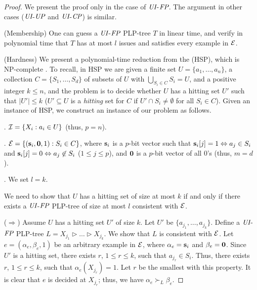 \begin{proof}
	We present the proof only in the case of $\textit{UI}$-$\textit{FP}$. The argument in other cases 
	($\textit{UI}$-$\textit{UP}$ and $\textit{UI}$-$\textit{CP}$) is similar.

	(Membership) One can guess a $\textit{UI}$-$\textit{FP}$ PLP-tree $T$ in linear time, and verify in polynomial time that 
	$T$ has at most $l$ issues and satisfies every example in $\mathcal{E}$.

	(Hardness) We present a polynomial-time reduction from the
	 (HSP), which is NP-complete 
    \cite{Garey:1979}. To recall, in HSP we are given a finite
		set $U=\{a_1,\ldots,a_n\}$, a collection $C=\{S_1,\ldots,
    S_d\}$ of subsets of $U$ with $\bigcup_{S_i \in C} S_i = U$,
    and a positive integer $k \leq n$, and the problem is to
    decide whether $U$ has a hitting set $U'$ such that $|U'|\leq k$ 
    ($U'\subseteq U$ is a \emph{hitting} set for $C$ if 
		$U' \cap S_i \not = \emptyset$ for all $S_i \in C$).
	Given an instance of HSP, we construct an instance of our problem as follows.

	. $\mathcal{I}=\{X_i: a_i \in U\}$ (thus, $p=n$).

	. $\mathcal{E}=\{(\textbf{s}_i, \textbf{0},1): S_i \in C\}$, where
	$\textbf{s}_i$ is a $p$-bit vector such that $\textbf{s}_i[j]=1 \Leftrightarrow a_j \in S_i$
	and $\textbf{s}_i[j]=0 \Leftrightarrow a_j \not \in S_i$ ($1 \leq j \leq p$), 
	and $\textbf{0}$ is a $p$-bit vector of all $0$'s (thus, $m=d$).

	. We set $l=k$.

	We need to show that $U$ has a hitting set of size at most $k$ if and only if
	there exists a $\textit{UI}$-$\textit{FP}$ PLP-tree of size at most $l$ consistent with $\mathcal{E}$.

\smallskip
\noindent
	($\Rightarrow$) Assume $U$ has a hitting set $U'$ of size $k$.
	Let $U'$ be $\{a_{j_1},\ldots,a_{j_k}\}$.
	Define a $\textit{UI}$-$\textit{FP}$ PLP-tree $L=X_{j_1} \triangleright \ldots \triangleright X_{j_k}$.
	We show that $L$ is consistent with $\mathcal{E}$.
	Let $e=(\alpha_e,\beta_e,1)$ be an arbitrary example in $\mathcal{E}$, where
	$\alpha_e=\textbf{s}_i$ and $\beta_e=\textbf{0}$.
	Since $U'$ is a hitting set, %
        there exists $r$, $1 \leq r \leq k$, 
        such that $a_{j_r} \in S_i$.
	Thus, %
        there exists $r$, $1 \leq r \leq k$, %
	such that $\alpha_e(X_{j_r})=1$.
	Let $r$ be the smallest with this property. 
	It is clear that $e$ is decided at $X_{j_r}$; thus, we have 
	$\alpha_e \succ_L \beta_e$.


\end{proof}
